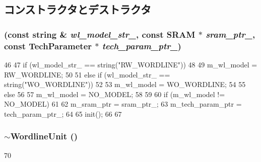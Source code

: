 \subsection{コンストラクタとデストラクタ}
\hypertarget{classWordlineUnit_a007bc361162be134cfe2984058f3acef}{
\subsubsection[{WordlineUnit}]{ (const string \& {\em wl\_\-model\_\-str\_\-}, \/  const {\bf SRAM} $\ast$ {\em sram\_\-ptr\_\-}, \/  const {\bf TechParameter} $\ast$ {\em tech\_\-param\_\-ptr\_\-})}}
\label{classWordlineUnit_a007bc361162be134cfe2984058f3acef}



\begin{DoxyCode}
46 {
47     if (wl_model_str_ == string("RW_WORDLINE"))
48     {
49         m_wl_model = RW_WORDLINE;
50     }
51     else if (wl_model_str_ == string("WO_WORDLINE"))
52     {
53         m_wl_model = WO_WORDLINE;
54     }
55     else 
56     {
57         m_wl_model = NO_MODEL;
58     }
59 
60     if (m_wl_model != NO_MODEL)
61     {
62         m_sram_ptr = sram_ptr_;
63         m_tech_param_ptr = tech_param_ptr_;
64 
65         init();
66     }
67 }
\end{DoxyCode}
\hypertarget{classWordlineUnit_a5044aff9e5837c5a7e9f6381ddaefe2e}{
\subsubsection[{$\sim$WordlineUnit}]{\setlength{\rightskip}{0pt plus 5cm}$\sim${\bf WordlineUnit} ()}}
\label{classWordlineUnit_a5044aff9e5837c5a7e9f6381ddaefe2e}



\begin{DoxyCode}
70 {}
\end{DoxyCode}


